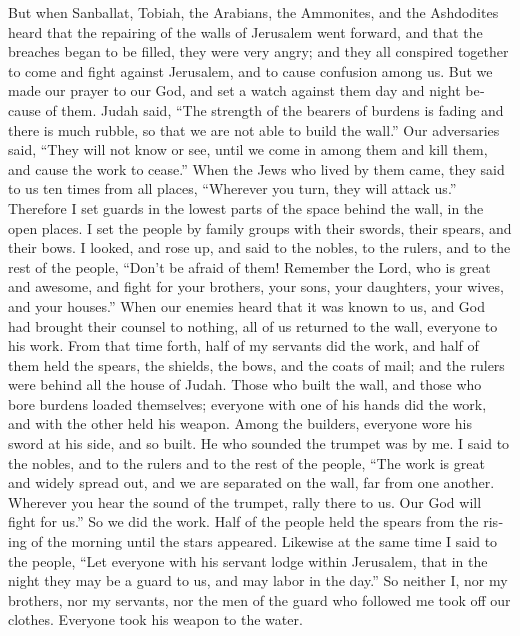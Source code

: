 \begin{paracol}{2}
\begin{otherlanguage}{english}
 But when Sanballat, Tobiah, the Arabians, the Ammonites,
and the Ashdodites heard that the repairing of the walls of Jerusalem
went forward, and that the breaches began to be filled, they were very
angry;  and they all conspired together to come and fight
against Jerusalem, and to cause confusion among us.  But
we made our prayer to our God, and set a watch against them day and
night because of them.  Judah said, ``The strength of the
bearers of burdens is fading and there is much rubble, so that we are
not able to build the wall.''  Our adversaries said,
``They will not know or see, until we come in among them and kill them,
and cause the work to cease.''  When the Jews who lived
by them came, they said to us ten times from all places, ``Wherever you
turn, they will attack us.''  Therefore I set guards in
the lowest parts of the space behind the wall, in the open places. I set
the people by family groups with their swords, their spears, and their
bows.  I looked, and rose up, and said to the nobles, to
the rulers, and to the rest of the people, ``Don't be afraid of them!
Remember the Lord, who is great and awesome, and fight for your
brothers, your sons, your daughters, your wives, and your houses.''
 When our enemies heard that it was known to us, and God
had brought their counsel to nothing, all of us returned to the wall,
everyone to his work.  From that time forth, half of my
servants did the work, and half of them held the spears, the shields,
the bows, and the coats of mail; and the rulers were behind all the
house of Judah.  Those who built the wall, and those who
bore burdens loaded themselves; everyone with one of his hands did the
work, and with the other held his weapon.  Among the
builders, everyone wore his sword at his side, and so built. He who
sounded the trumpet was by me.  I said to the nobles, and
to the rulers and to the rest of the people, ``The work is great and
widely spread out, and we are separated on the wall, far from one
another.  Wherever you hear the sound of the trumpet,
rally there to us. Our God will fight for us.''  So we
did the work. Half of the people held the spears from the rising of the
morning until the stars appeared.  Likewise at the same
time I said to the people, ``Let everyone with his servant lodge within
Jerusalem, that in the night they may be a guard to us, and may labor in
the day.''  So neither I, nor my brothers, nor my
servants, nor the men of the guard who followed me took off our clothes.
Everyone took his weapon to the water.


\end{otherlanguage}
\end{paracol}
